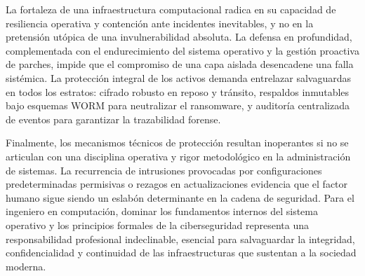 \documentclass[12pt]{article}
\begin{document}
La fortaleza de una infraestructura computacional radica en su capacidad de resiliencia operativa y contención ante incidentes inevitables, y no en la pretensión utópica de una invulnerabilidad absoluta. La defensa en profundidad, complementada con el endurecimiento del sistema operativo y la gestión proactiva de parches, impide que el compromiso de una capa aislada desencadene una falla sistémica. La protección integral de los activos demanda entrelazar salvaguardas en todos los estratos: cifrado robusto en reposo y tránsito, respaldos inmutables bajo esquemas WORM para neutralizar el ransomware, y auditoría centralizada de eventos para garantizar la trazabilidad forense.

Finalmente, los mecanismos técnicos de protección resultan inoperantes si no se articulan con una disciplina operativa y rigor metodológico en la administración de sistemas. La recurrencia de intrusiones provocadas por configuraciones predeterminadas permisivas o rezagos en actualizaciones evidencia que el factor humano sigue siendo un eslabón determinante en la cadena de seguridad. Para el ingeniero en computación, dominar los fundamentos internos del sistema operativo y los principios formales de la ciberseguridad representa una responsabilidad profesional indeclinable, esencial para salvaguardar la integridad, confidencialidad y continuidad de las infraestructuras que sustentan a la sociedad moderna.

\newpage
\nocite{*}
\printbibliography[heading=bibintoc, title={Referencias}]
\end{document}
